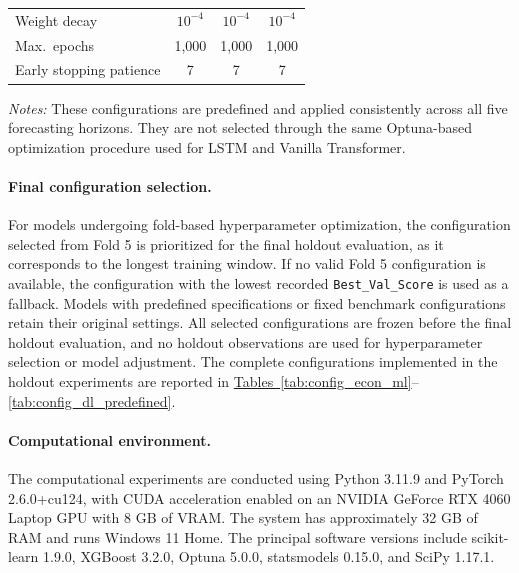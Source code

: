 \documentclass[runningheads,orivec]{llncs}
\begin{document}
\begin{table}[htbp]
\begin{tabular}{lccc}
Weight decay            & $10^{-4}$    & $10^{-4}$ & $10^{-4}$ \\
Max.\ epochs            & 1,000        & 1,000   & 1,000 \\
Early stopping patience & 7            & 7       & 7 \\
\hline
\end{tabular}
\par\vspace{4pt}\parbox{\linewidth}{\scriptsize\textit{Notes:} These configurations are predefined and applied consistently across all five forecasting horizons. They are not selected through the same Optuna-based optimization procedure used for LSTM and Vanilla Transformer.}
\end{table}

\paragraph{Final configuration selection.} For models undergoing fold-based hyperparameter optimization, the configuration selected from Fold 5 is prioritized for the final holdout evaluation, as it corresponds to the longest training window. If no valid Fold 5 configuration is available, the configuration with the lowest recorded \texttt{Best\_Val\_Score} is used as a fallback. Models with predefined specifications or fixed benchmark configurations retain their original settings. All selected configurations are frozen before the final holdout evaluation, and no holdout observations are used for hyperparameter selection or model adjustment. The complete configurations implemented in the holdout experiments are reported in \hyperref[tab:config_econ_ml]{Tables~\ref*{tab:config_econ_ml}}--\hyperref[tab:config_dl_predefined]{\ref*{tab:config_dl_predefined}}.

\paragraph{Computational environment.} The computational experiments are conducted using Python 3.11.9 and PyTorch 2.6.0+cu124, with CUDA acceleration enabled on an NVIDIA GeForce RTX 4060 Laptop GPU with 8 GB of VRAM. The system has approximately 32 GB of RAM and runs Windows 11 Home. The principal software versions include scikit-learn 1.9.0, XGBoost 3.2.0, Optuna 5.0.0, statsmodels 0.15.0, and SciPy 1.17.1.
\end{document}
